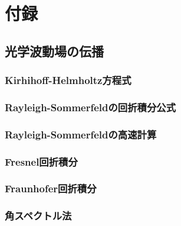 ﻿\chapter{付録}
\lhead[付録]{}
\label{appendix}
\graphicspath{{figure/}}
\minitoc

\newpage
\section{光学波動場の伝播}
\subsection{Kirhihoff-Helmholtz方程式}

\subsection{Rayleigh-Sommerfeldの回折積分公式}

\subsection{Rayleigh-Sommerfeldの高速計算}

\subsection{Fresnel回折積分}

\subsection{Fraunhofer回折積分}

\subsection{角スペクトル法}


